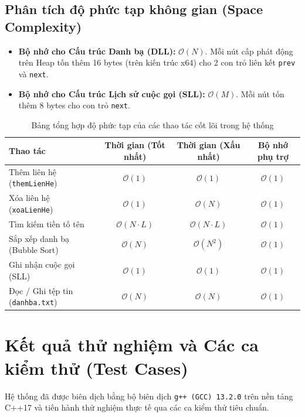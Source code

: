 \documentclass[12pt,a4paper]{report}
\begin{document}
\subsection{Phân tích độ phức tạp không gian (Space Complexity)}

\begin{itemize}
    \item \textbf{Bộ nhớ cho Cấu trúc Danh bạ (DLL):} $\mathcal{O}(N)$. Mỗi nút cấp phát động trên Heap tốn thêm 16 bytes (trên kiến trúc x64) cho 2 con trỏ liên kết \texttt{prev} và \texttt{next}.
    \item \textbf{Bộ nhớ cho Cấu trúc Lịch sử cuộc gọi (SLL):} $\mathcal{O}(M)$. Mỗi nút tốn thêm 8 bytes cho con trỏ \texttt{next}.
\end{itemize}

\begin{table}[htbp]
\centering
\small
\caption{Bảng tổng hợp độ phức tạp của các thao tác cốt lõi trong hệ thống}
\label{tab:do_phuc_tap}
\begin{tabular}{|l|c|c|c|}
\hline
\textbf{Thao tác} & \textbf{Thời gian (Tốt nhất)} & \textbf{Thời gian (Xấu nhất)} & \textbf{Bộ nhớ phụ trợ} \\ \hline
Thêm liên hệ (\texttt{themLienHe}) & $\mathcal{O}(1)$ & $\mathcal{O}(1)$ & $\mathcal{O}(1)$ \\ \hline
Xóa liên hệ (\texttt{xoaLienHe}) & $\mathcal{O}(1)$ & $\mathcal{O}(N)$ & $\mathcal{O}(1)$ \\ \hline
Tìm kiếm tiền tố tên & $\mathcal{O}(N \cdot L)$ & $\mathcal{O}(N \cdot L)$ & $\mathcal{O}(1)$ \\ \hline
Sắp xếp danh bạ (Bubble Sort) & $\mathcal{O}(N)$ & $\mathcal{O}(N^2)$ & $\mathcal{O}(1)$ \\ \hline
Ghi nhận cuộc gọi (SLL) & $\mathcal{O}(1)$ & $\mathcal{O}(1)$ & $\mathcal{O}(1)$ \\ \hline
Đọc / Ghi tệp tin (\texttt{danhba.txt}) & $\mathcal{O}(N)$ & $\mathcal{O}(N)$ & $\mathcal{O}(1)$ \\ \hline
\end{tabular}
\end{table}

\section{Kết quả thử nghiệm và Các ca kiểm thử (Test Cases)}
\label{sec:ket_qua_thu_nghiem}

Hệ thống đã được biên dịch bằng bộ biên dịch \texttt{g++ (GCC) 13.2.0} trên nền tảng C++17 và tiến hành thử nghiệm thực tế qua các ca kiểm thử tiêu chuẩn.
\end{document}
